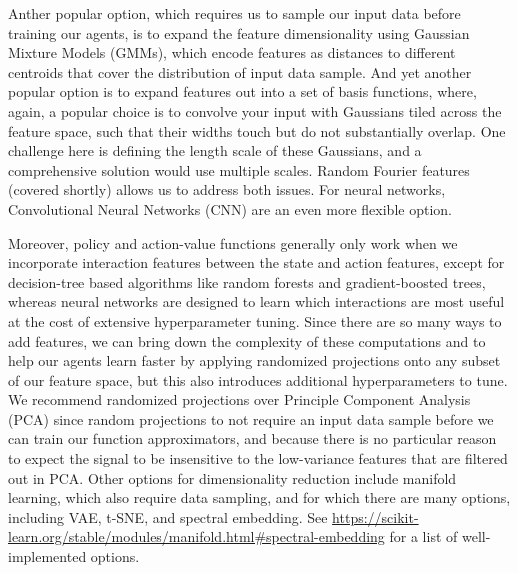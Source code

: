 \documentclass{article}
\begin{document}
Anther popular option, which requires us to sample our input data before training our agents, is to expand the feature dimensionality using Gaussian Mixture Models (GMMs), which encode features as distances to different centroids that cover the distribution of input data sample. And yet another popular option is to expand features out into a set of basis functions, where, again, a popular choice is to convolve your input with Gaussians tiled across the feature space, such that their widths touch but do not substantially overlap. One challenge here is defining the length scale of these Gaussians, and a comprehensive solution would use multiple scales. Random Fourier features (covered shortly) allows us to address both issues. For neural networks, Convolutional Neural Networks (CNN) are an even more flexible option.

Moreover, policy and action-value functions generally only work when we incorporate interaction features between the state and action features, except for decision-tree based algorithms like random forests and gradient-boosted trees, whereas neural networks are designed to learn which interactions are most useful at the cost of extensive hyperparameter tuning. Since there are so many ways to add features, we can bring down the complexity of these computations and to help our agents learn faster by applying randomized projections onto any subset of our feature space, but this also introduces additional hyperparameters to tune. We recommend randomized projections over Principle Component Analysis (PCA) since random projections to not require an input data sample before we can train our function approximators, and because there is no particular reason to expect the signal to be insensitive to the low-variance features that are filtered out in PCA. Other options for dimensionality reduction include manifold learning, which also require data sampling, and for which there are many options, including VAE, t-SNE, and spectral embedding. See \url{https://scikit-learn.org/stable/modules/manifold.html#spectral-embedding} for a list of well-implemented options.
\end{document}
